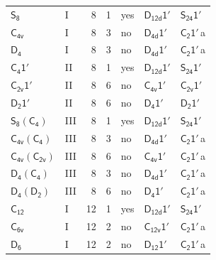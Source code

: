 \documentclass[10pt,a4paper]{article}
\numberwithin{equation}{section}
\newcommand{\grp}[1]{\mathsf{#1}}
\newcommand{\clsletter}[1]{\,{\scriptsize\color{black!55}#1}}
\begin{document}
{\begin{longtable}{@{}llrrlll@{}}
\href{../../../rotation/data/pdf/S8.pdf}{$\grp{S_{8}}$} & I & 8 & 1 & yes & \href{D12d-1p.pdf}{$\grp{D_{12d}1'}$} & \href{S24-1p.pdf}{$\grp{S_{24}1'}$}\\
\href{../../../rotation/data/pdf/C4v.pdf}{$\grp{C_{4v}}$} & I & 8 & 3 & no & \href{D4d-1p.pdf}{$\grp{D_{4d}1'}$} & \href{C2-1p.pdf}{$\grp{C_{2}1'}$}\clsletter{a}\\
\href{../../../rotation/data/pdf/D4.pdf}{$\grp{D_{4}}$} & I & 8 & 3 & no & \href{D4d-1p.pdf}{$\grp{D_{4d}1'}$} & \href{C2-1p.pdf}{$\grp{C_{2}1'}$}\clsletter{a}\\
\href{C4-1p.pdf}{$\grp{C_{4}1'}$} & II & 8 & 1 & yes & \href{D12d-1p.pdf}{$\grp{D_{12d}1'}$} & \href{S24-1p.pdf}{$\grp{S_{24}1'}$}\\
\href{C2v-1p.pdf}{$\grp{C_{2v}1'}$} & II & 8 & 6 & no & \href{C4v-1p.pdf}{$\grp{C_{4v}1'}$} & \href{C2v-1p.pdf}{$\grp{C_{2v}1'}$}\\
\href{D2-1p.pdf}{$\grp{D_{2}1'}$} & II & 8 & 6 & no & \href{D4-1p.pdf}{$\grp{D_{4}1'}$} & \href{D2-1p.pdf}{$\grp{D_{2}1'}$}\\
\href{S8-C4.pdf}{$\grp{S_{8}}(\grp{C_{4}})$} & III & 8 & 1 & yes & \href{D12d-1p.pdf}{$\grp{D_{12d}1'}$} & \href{S24-1p.pdf}{$\grp{S_{24}1'}$}\\
\href{C4v-C4.pdf}{$\grp{C_{4v}}(\grp{C_{4}})$} & III & 8 & 3 & no & \href{D4d-1p.pdf}{$\grp{D_{4d}1'}$} & \href{C2-1p.pdf}{$\grp{C_{2}1'}$}\clsletter{a}\\
\href{C4v-C2v.pdf}{$\grp{C_{4v}}(\grp{C_{2v}})$} & III & 8 & 6 & no & \href{C4v-1p.pdf}{$\grp{C_{4v}1'}$} & \href{C2-1p.pdf}{$\grp{C_{2}1'}$}\clsletter{a}\\
\href{D4-C4.pdf}{$\grp{D_{4}}(\grp{C_{4}})$} & III & 8 & 3 & no & \href{D4d-1p.pdf}{$\grp{D_{4d}1'}$} & \href{C2-1p.pdf}{$\grp{C_{2}1'}$}\clsletter{a}\\
\href{D4-D2.pdf}{$\grp{D_{4}}(\grp{D_{2}})$} & III & 8 & 6 & no & \href{D4-1p.pdf}{$\grp{D_{4}1'}$} & \href{C2-1p.pdf}{$\grp{C_{2}1'}$}\clsletter{a}\\
\href{../../../rotation/data/pdf/C12.pdf}{$\grp{C_{12}}$} & I & 12 & 1 & yes & \href{D12d-1p.pdf}{$\grp{D_{12d}1'}$} & \href{S24-1p.pdf}{$\grp{S_{24}1'}$}\\
\href{../../../rotation/data/pdf/C6v.pdf}{$\grp{C_{6v}}$} & I & 12 & 2 & no & \href{C12v-1p.pdf}{$\grp{C_{12v}1'}$} & \href{C2-1p.pdf}{$\grp{C_{2}1'}$}\clsletter{a}\\
\href{../../../rotation/data/pdf/D6.pdf}{$\grp{D_{6}}$} & I & 12 & 2 & no & \href{D12-1p.pdf}{$\grp{D_{12}1'}$} & \href{C2-1p.pdf}{$\grp{C_{2}1'}$}\clsletter{a}\\

\end{longtable}}
\end{document}
